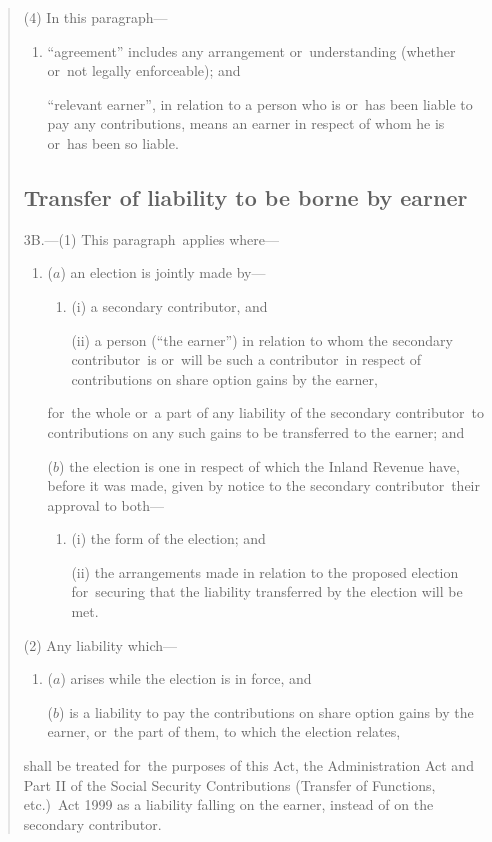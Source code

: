 \documentclass[12pt,a4paper]{article}
\begin{document}
\begin{quotation}
(4) In this paragraph—
\begin{enumerate}\item[]
    “agreement” includes any arrangement or~understanding (whether or~not legally enforceable); and

    “relevant earner”, in relation to a person who is or~has been liable to pay any contributions, means an earner in respect of whom he is or~has been so liable. 
\end{enumerate}

\subsection*{Transfer of liability to be borne by earner}

3B.---(1) This paragraph~applies where—
\begin{enumerate}\item[]
($a$) an election is jointly made by—
\begin{enumerate}\item[]
(i) a secondary contributor, and

(ii) a person (“the earner”) in relation to whom the secondary contributor~is or~will be such a contributor~in respect of contributions on share option gains by the earner,
\end{enumerate}
for~the whole or~a part of any liability of the secondary contributor~to contributions on any such gains to be transferred to the earner; and

($b$) the election is one in respect of which the Inland Revenue have, before it was made, given by notice to the secondary contributor~their approval to both—
\begin{enumerate}\item[]
(i) the form of the election; and

(ii) the arrangements made in relation to the proposed election for~securing that the liability transferred by the election will be met.
\end{enumerate}
\end{enumerate}

(2) Any liability which—
\begin{enumerate}\item[]
($a$) arises while the election is in force, and

($b$) is a liability to pay the contributions on share option gains by the earner, or~the part of them, to which the election relates,
\end{enumerate}
shall be treated for~the purposes of this Act, the Administration Act and Part II of the Social Security Contributions (Transfer of Functions, etc.)\ Act 1999 as a liability falling on the earner, instead of on the secondary contributor.


\end{quotation}
\end{document}

